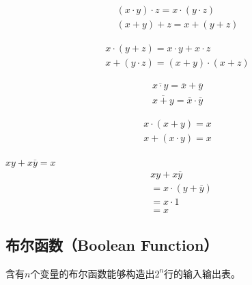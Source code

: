 \documentclass[12pt, openany, oneside]{book}
\begin{document}
\begin{tcolorbox}
	\begin{align}
		(x \cdot y) \cdot z = x \cdot (y \cdot z) \\
		(x + y) + z = x + (y + z)
	\end{align}
\end{tcolorbox}

\begin{tcolorbox}
	\begin{align}
		x \cdot (y + z) = x \cdot y + x \cdot z \\
		x + (y \cdot z) = (x + y) \cdot (x + z)
	\end{align}
\end{tcolorbox}

\begin{tcolorbox}
	\begin{align}
		\overline{x \cdot y} = \overline x + \overline y \\
		\overline{x + y} = \overline x \cdot \overline y
	\end{align}
\end{tcolorbox}

\begin{tcolorbox}
	\begin{align}
		x \cdot (x + y) = x \\
		x + (x \cdot y) = x
	\end{align}
\end{tcolorbox}

\begin{tcolorbox}
	$ xy + x \overline y = x $
	\begin{align}
		 & xy + x \overline y          \\
		 & = x \cdot (y + \overline y) \\
		 & = x \cdot 1                 \\
		 & = x
	\end{align}
\end{tcolorbox}

\vspace{0.5cm}

\subsection{布尔函数（Boolean Function）}

含有$ n $个变量的布尔函数能够构造出$ 2^n $行的输入输出表。
\end{document}
